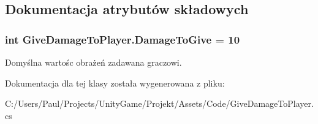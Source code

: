 \subsection{Dokumentacja atrybutów składowych}
\subsubsection[{Damage\+To\+Give}]{\setlength{\rightskip}{0pt plus 5cm}int Give\+Damage\+To\+Player.\+Damage\+To\+Give = 10}\label{class_give_damage_to_player_a77c01e1c1f269957c6b5230334334578}


Domyślna wartośc obrażeń zadawana graczowi. 



Dokumentacja dla tej klasy została wygenerowana z pliku\+:\begin{DoxyCompactItemize}
\item 
C\+:/\+Users/\+Paul/\+Projects/\+Unity\+Game/\+Projekt/\+Assets/\+Code/Give\+Damage\+To\+Player.\+cs\end{DoxyCompactItemize}

